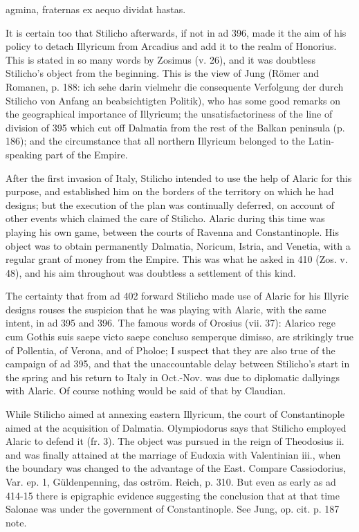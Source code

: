 agmina, fraternas ex aequo dividat hastas.

It is certain too that Stilicho afterwards, if not in ad 396, made it the aim of his policy to detach Illyricum from Arcadius and add it to the realm of Honorius. This is stated in so many words by Zosimus (v. 26), and it was doubtless Stilicho\texthebrew{}’s object from the beginning. This is the view of Jung (Römer and Romanen, p. 188: ich sehe darin vielmehr die consequente Verfolgung der durch Stilicho von Anfang an beabsichtigten Politik), who has some good remarks on the geographical importance of Illyricum; the unsatisfactoriness of the line of division of 395 which cut off Dalmatia from the rest of the Balkan peninsula (p. 186); and the circumstance that all northern Illyricum belonged to the Latin-speaking part of the Empire.

After the first invasion of Italy, Stilicho intended to use the help of Alaric for this purpose, and established him on the borders of the territory on which he had designs; but the execution of the plan was continually deferred, on account of other events which claimed the care of Stilicho. Alaric during this time was playing his own game, between the courts of Ravenna and Constantinople. His object was to obtain permanently Dalmatia, Noricum, Istria, and Venetia, with a regular grant of money from the Empire. This was what he asked in 410 (Zos. v. 48), and his aim throughout was doubtless a settlement of this kind.

The certainty that from ad 402 forward Stilicho made use of Alaric for his Illyric designs rouses the suspicion that he was playing with Alaric, with the same intent, in ad 395 and 396. The famous words of Orosius (vii. 37): Alarico rege cum Gothis suis saepe victo saepe concluso semperque dimisso, are strikingly true of Pollentia, of Verona, and of Pholoe; I suspect that they are also true of the campaign of ad 395, and that the unaccountable delay between Stilicho\texthebrew{}’s start in the spring and his return to Italy in Oct.-Nov. was due to diplomatic dallyings with Alaric. Of course nothing would be said of that by Claudian.

While Stilicho aimed at annexing eastern Illyricum, the court of Constantinople aimed at the acquisition of Dalmatia. Olympiodorus says that Stilicho employed Alaric to defend it (fr. 3). The object was pursued in the reign of Theodosius ii. and was finally attained at the marriage of Eudoxia with Valentinian iii., when the boundary was changed to the advantage of the East. Compare Cassiodorius, Var. ep. 1, Güldenpenning, das oström. Reich, p. 310. But even as early as ad 414-15 there is epigraphic evidence suggesting the conclusion that at that time Salonae was under the government of Constantinople. See Jung, op. cit. p. 187 note.

